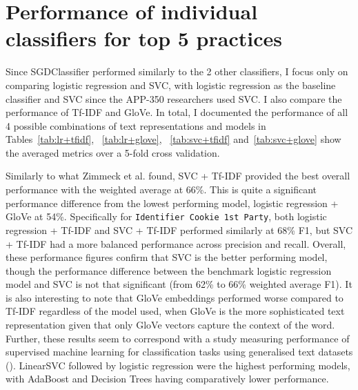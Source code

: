 \section{Performance of individual classifiers for top 5 practices}
Since SGDClassifier performed similarly to the 2 other classifiers, I focus only on comparing logistic regression and SVC, with logistic regression as the baseline classifier and SVC since the APP-350 researchers used SVC. I also compare the performance of Tf-IDF and GloVe. In total, I documented the performance of all 4 possible combinations of text representations and models in Tables~\ref{tab:lr+tfidf}, ~\ref{tab:lr+glove}, ~\ref{tab:svc+tfidf} and~\ref{tab:svc+glove} show the averaged metrics over a 5-fold cross validation. 

Similarly to what Zimmeck et al. found, SVC + Tf-IDF provided the best overall performance with the weighted average at 66\%. This is quite a significant performance difference from the lowest performing model, logistic regression + GloVe at 54\%. Specifically for \texttt{Identifier Cookie 1st Party}, both logistic regression + Tf-IDF and SVC + Tf-IDF performed similarly at 68\% F1, but SVC + Tf-IDF had a more balanced performance across precision and recall. Overall, these performance figures confirm that SVC is the better performing model, though the performance difference between the benchmark logistic regression model and SVC is not that significant (from 62\% to 66\% weighted average F1). It is also interesting to note that GloVe embeddings performed worse compared to Tf-IDF regardless of the model used, when GloVe is the more sophisticated text representation given that only GloVe vectors capture the context of the word. Further, these results seem to correspond with a study measuring performance of supervised machine learning for classification tasks using generalised text datasets (\cite{hsu2020}). LinearSVC followed by logistic regression were the highest performing models, with AdaBoost and Decision Trees having comparatively lower performance.

